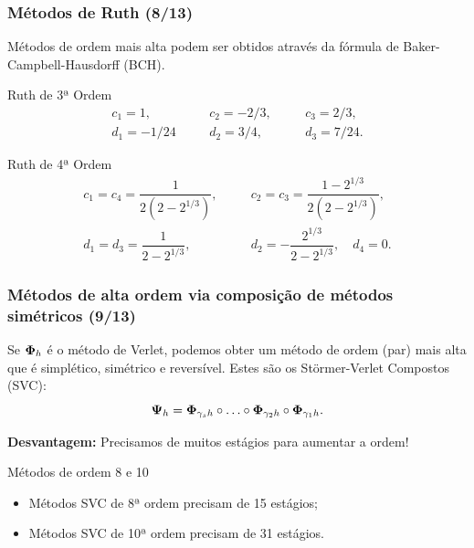 \begin{frame}
\justifying
\frametitle{Métodos de Ruth (8/13)}

Métodos de ordem mais alta podem ser obtidos através da fórmula de Baker-Campbell-Hausdorff (BCH).

\begin{exampleblock}{Ruth de 3ª Ordem \cite{ruth3}}
    \begin{align*}
        c_1 = 1,    & \quad & c_2 = -2/3, & \quad & c_3 = 2/3, \\
        d_1 = -1/24 & \quad & d_2 = 3/4,  & \quad & d_3 = 7/24.
    \end{align*}
\end{exampleblock}

\begin{exampleblock}{Ruth de 4ª Ordem \cite{ruth4}}
    \begin{align*}
        c_1 = c_4 = \dfrac{1}{2(2-2^{1/3})}, & \quad & c_2 = c_3 = \dfrac{1-2^{1/3}}{2(2-2^{1/3})}, \\
        d_1 = d_3 = \dfrac{1}{2-2^{1/3}}, & \quad & d_2 = - \dfrac{2^{1/3}}{2-2^{1/3}}, \quad d_4 = 0.
    \end{align*}
\end{exampleblock}

\end{frame}


\begin{frame}
\justifying
\frametitle{Métodos de alta ordem via composição de métodos simétricos (9/13)}

Se $\bm \Phi_{h}$ é o método de Verlet, podemos obter um método de ordem (par) mais alta que é simplético, simétrico e reversível. Estes são os Störmer-Verlet Compostos (SVC):
$$
\bm \Psi_h = \bm \Phi_{\gamma_s h} \circ \hdots \circ \bm \Phi_{\gamma_2 h} \circ \bm \Phi_{\gamma_1 h}.
$$
\pause
\begin{alertblock}{}
    \textbf{Desvantagem:} Precisamos de muitos estágios para aumentar a ordem!
\end{alertblock}
\pause
\begin{exampleblock}{Métodos de ordem 8 e 10 \cite{hairer}}
\begin{itemize}
    \item Métodos SVC de 8ª ordem precisam de 15 estágios;

    \item Métodos SVC de 10ª ordem precisam de 31 estágios.
\end{itemize}
\end{exampleblock}

\end{frame}

